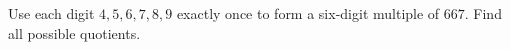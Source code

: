 Use each digit $4,5,6,7,8,9$ exactly once to form a six-digit multiple of $667$. Find all possible quotients.

